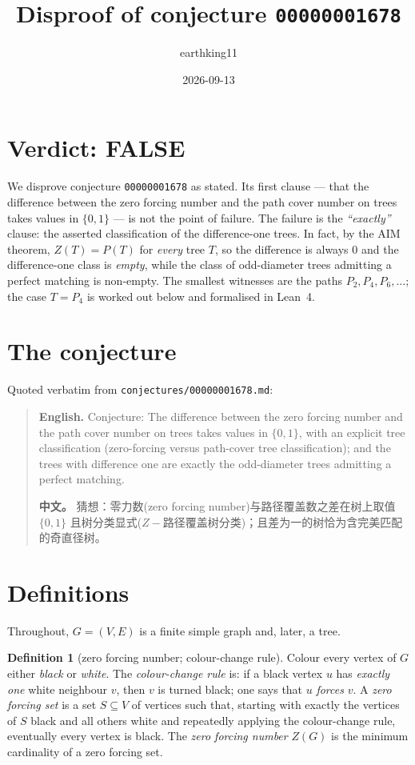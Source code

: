 \documentclass[11pt]{article}
\title{Disproof of conjecture \texttt{00000001678}}
\author{earthking11}
\date{2026-09-13}
\theoremstyle{definition}
\newtheorem{definition}[theorem]{Definition}
\theoremstyle{remark}
\begin{document}
\maketitle

\section*{Verdict: FALSE}

We disprove conjecture \texttt{00000001678} as stated. Its first clause --- that
the difference between the zero forcing number and the path cover number on
trees takes values in $\{0,1\}$ --- is not the point of failure. The failure is
the \emph{``exactly''} clause: the asserted classification of the difference-one
trees. In fact, by the AIM theorem, $Z(T)=P(T)$ for \emph{every} tree $T$, so the
difference is always $0$ and the difference-one class is \emph{empty}, while the
class of odd-diameter trees admitting a perfect matching is non-empty. The
smallest witnesses are the paths $P_2, P_4, P_6, \dots$; the case $T=P_4$ is
worked out below and formalised in Lean~4.

\section{The conjecture}

Quoted verbatim from \texttt{conjectures/00000001678.md}:

\begin{quote}
\textbf{English.} Conjecture: The difference between the zero forcing number and
the path cover number on trees takes values in $\{0, 1\}$, with an explicit tree
classification (zero-forcing versus path-cover tree classification); and the
trees with difference one are exactly the odd-diameter trees admitting a perfect
matching.

\textbf{中文。} 猜想：零力数(zero forcing number)与路径覆盖数之差在树上取值
$\{0, 1\}$ 且树分类显式($Z-$路径覆盖树分类)；且差为一的树恰为含完美匹配的奇直径树。
\end{quote}

\section{Definitions}

Throughout, $G=(V,E)$ is a finite simple graph and, later, a tree.

\begin{definition}[zero forcing number; colour-change rule]
Colour every vertex of $G$ either \emph{black} or \emph{white}. The
\emph{colour-change rule} is: if a black vertex $u$ has \emph{exactly one} white
neighbour $v$, then $v$ is turned black; one says that $u$ \emph{forces} $v$. A
\emph{zero forcing set} is a set $S\subseteq V$ of vertices such that, starting
with exactly the vertices of $S$ black and all others white and repeatedly
applying the colour-change rule, eventually every vertex is black. The
\emph{zero forcing number} $Z(G)$ is the minimum cardinality of a zero forcing
set.
\end{definition}
\end{document}
